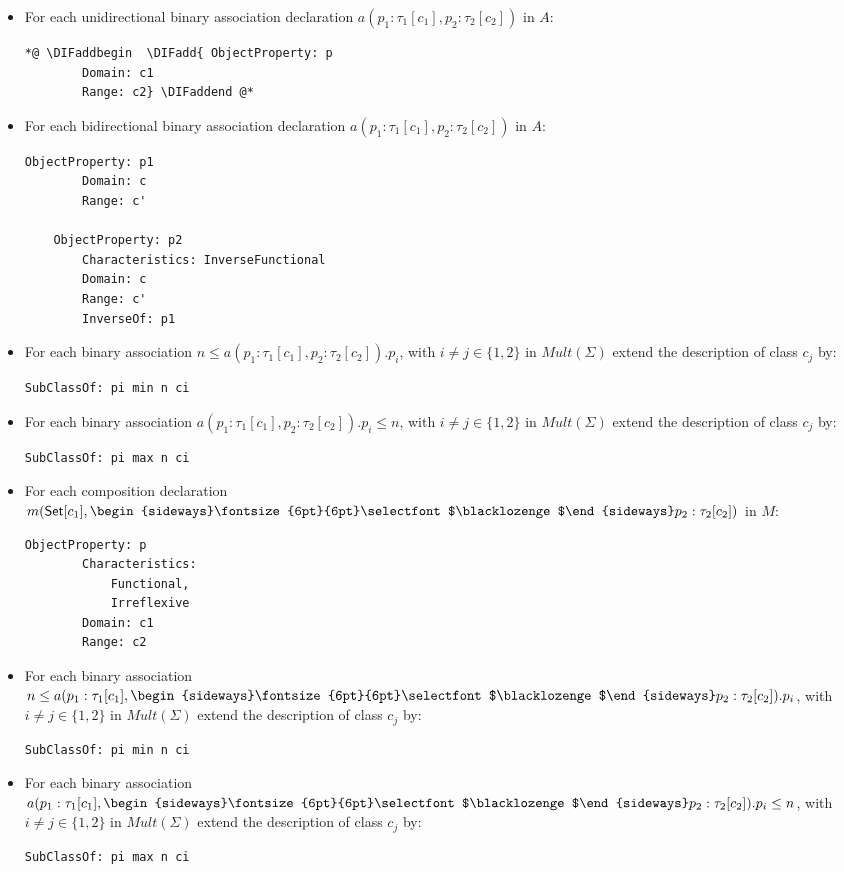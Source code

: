 \documentclass[10pt,fleqn,final]{scrreprt}
\newenvironment{definitions}[0]{\medskip }{}
\newcommand{\composition}{\raisebox{0.2pt}{\begin{sideways}\fontsize{6pt}{6pt}\selectfont$\blacklozenge$\end{sideways}}}
\providecommand{\DIFadd}[1]{{\protect\color{blue}\uwave{#1}}} %
\providecommand{\DIFaddbegin}{} %
\providecommand{\DIFaddend}{} %
\begin{document}
\begin{definitions}
\begin{itemize}
\item For each unidirectional binary association declaration $a(p_1:\tau_1[c_1],p_2:\tau_2[c_2])$ in $A$:
 \begin{lstlisting}[language=owl2Manchester]
	*@ \DIFaddbegin  \DIFadd{ ObjectProperty: p
		Domain: c1
		Range: c2} \DIFaddend @* 
\end{lstlisting}
\item For each bidirectional binary association declaration $a(p_1:\tau_1[c_1],p_2:\tau_2[c_2])$ in $A$:
 \begin{lstlisting}[language=owl2Manchester]
	ObjectProperty: p1
		Domain: c
		Range: c'

	ObjectProperty: p2
		Characteristics: InverseFunctional
		Domain: c
		Range: c'
		InverseOf: p1
\end{lstlisting}
\item For each binary association $n \leq a(p_1:\tau_1[c_1],p_2:\tau_2[c_2]).p_i$, with $i \neq j\in\{1,2\}$ in $\mathit{Mult}(\Sigma)$ extend the description of class $c_j$ by:
 \begin{lstlisting}[language=owl2Manchester]
	SubClassOf: pi min n ci
\end{lstlisting}
\item For each binary association $a(p_1:\tau_1[c_1],p_2:\tau_2[c_2]).p_i \leq n$, with $i \neq j\in\{1,2\}$  in $\mathit{Mult}(\Sigma)$ extend the description of class $c_j$ by:
 \begin{lstlisting}[language=owl2Manchester]
	SubClassOf: pi max n ci
\end{lstlisting}
\item For each composition declaration $m(\mathsf{Set}[c_1], \composition p_2 :
\tau_2[c_2])$ in $M$:
\begin{lstlisting}[language=owl2Manchester]
	ObjectProperty: p
		Characteristics:
			Functional, 
			Irreflexive
		Domain: c1
		Range: c2
\end{lstlisting}
\item For each binary association $n \leq a(p_1:\tau_1[c_1], \composition p_2:\tau_2[c_2]).p_i$, with $i \neq j\in\{1,2\}$  in $\mathit{Mult}(\Sigma)$  extend the description of class $c_j$ by:
\begin{lstlisting}[language=owl2Manchester]
	SubClassOf: pi min n ci
\end{lstlisting}
\item For each binary association $a(p_1:\tau_1[c_1], \composition p_2:\tau_2[c_2]).p_i \leq n$, with $i \neq j\in\{1,2\}$  in $\mathit{Mult}(\Sigma)$ extend the description of class $c_j$ by:
\begin{lstlisting}[language=owl2Manchester]
	SubClassOf: pi max n ci
\end{lstlisting}
\end{itemize}



\end{definitions}
\end{document}
